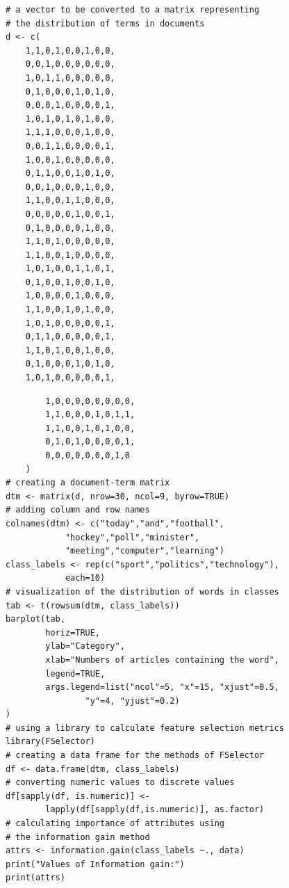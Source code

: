 \documentclass[10pt]{book}
\begin{document}
\begin{verbatim}
# a vector to be converted to a matrix representing
# the distribution of terms in documents
d <- c(
    1,1,0,1,0,0,1,0,0,
    0,0,1,0,0,0,0,0,0,
    1,0,1,1,0,0,0,0,0,
    0,1,0,0,0,1,0,1,0,
    0,0,0,1,0,0,0,0,1,
    1,0,1,0,1,0,1,0,0,
    1,1,1,0,0,0,1,0,0,
    0,0,1,1,0,0,0,0,1,
    1,0,0,1,0,0,0,0,0,
    0,1,1,0,0,1,0,1,0,
    0,0,1,0,0,0,1,0,0,
    1,1,0,0,1,1,0,0,0,
    0,0,0,0,0,1,0,0,1,
    0,1,0,0,0,0,1,0,0,
    1,1,0,1,0,0,0,0,0,
    1,1,0,0,1,0,0,0,0,
    1,0,1,0,0,1,1,0,1,
    0,1,0,0,1,0,0,1,0,
    1,0,0,0,0,1,0,0,0,
    1,1,0,0,1,0,1,0,0,
    1,0,1,0,0,0,0,0,1,
    0,1,1,0,0,0,0,0,1,
    1,1,0,1,0,0,1,0,0,
    0,1,0,0,0,1,0,1,0,
    1,0,1,0,0,0,0,0,1,
\end{verbatim}

\begin{verbatim}
        1,0,0,0,0,0,0,0,0,
        1,1,0,0,0,1,0,1,1,
        1,1,0,0,1,0,1,0,0,
        0,1,0,1,0,0,0,0,1,
        0,0,0,0,0,0,0,1,0
    )
# creating a document-term matrix
dtm <- matrix(d, nrow=30, ncol=9, byrow=TRUE)
# adding column and row names
colnames(dtm) <- c("today","and","football",
            "hockey","poll","minister",
            "meeting","computer","learning")
class_labels <- rep(c("sport","politics","technology"),
            each=10)
# visualization of the distribution of words in classes
tab <- t(rowsum(dtm, class_labels))
barplot(tab,
        horiz=TRUE,
        ylab="Category",
        xlab="Numbers of articles containing the word",
        legend=TRUE,
        args.legend=list("ncol"=5, "x"=15, "xjust"=0.5,
                "y"=4, "yjust"=0.2)
)
# using a library to calculate feature selection metrics
library(FSelector)
# creating a data frame for the methods of FSelector
df <- data.frame(dtm, class_labels)
# converting numeric values to discrete values
df[sapply(df, is.numeric)] <-
        lapply(df[sapply(df,is.numeric)], as.factor)
# calculating importance of attributes using
# the information gain method
attrs <- information.gain(class_labels ~., data)
print("Values of Information gain:")
print(attrs)
\end{verbatim}
\end{document}
